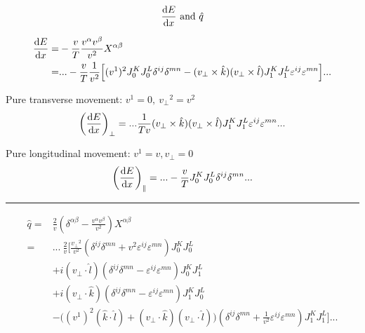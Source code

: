 $$ \frac{\mathop{}\!\mathrm{d} E}{\mathop{}\!\mathrm{d} x} \text{ and } \hat{q} $$

\begin{equation*}
\begin{split}
\frac{\mathop{}\!\mathrm{d} E}{\mathop{}\!\mathrm{d} x} = & -\frac{v}{T} \frac{v^\alpha v^\beta}{v^2} X^{\alpha \beta} \\
 = & ... -\frac{v}{T} \frac{1}{v^2} \Big[ (v^1)^2 J_0^K J_0^L \delta^{ij} \delta^{mn} - (v_\perp \times \hat{k})(v_\perp \times \hat{l}) J_1^K J_1^L  \varepsilon^{ij} \varepsilon^{mn}\Big] ...
\end{split}
\end{equation*}

Pure transverse movement: $v^1 = 0, ~ {v_\perp}^2 = v^2$
\begin{equation*}
\begin{split}
\left( \frac{\mathop{}\!\mathrm{d} E}{\mathop{}\!\mathrm{d} x} \right)_\perp = ... \frac{1}{Tv} (v_\perp \times \hat{k})(v_\perp \times \hat{l}) J_1^K J_1^L  \varepsilon^{ij} \varepsilon^{mn} ...
\end{split}
\end{equation*}

Pure longitudinal movement: $v^1 = v, v_\perp=0$
\begin{equation*}
\left(\frac{\mathop{}\!\mathrm{d} E}{\mathop{}\!\mathrm{d} x} \right)_\parallel = ... -\frac{v}{T} J_0^K J_0^L \delta^{ij} \delta^{mn} ...
\end{equation*}

\hrule

\begin{equation*}
\begin{split}
\hat{q} = & \frac{2}{v} \left( \delta^{\alpha \beta} - \frac{v^\alpha v^\beta}{v^2} \right) X^{\alpha \beta} \\
= & ...~ \frac{2}{v} \Bigg[\frac{{v_\perp}^2}{v^2} \left( \delta^{ij} \delta^{mn} + v^2 \varepsilon^{ij} \varepsilon^{mn} \right) J_0 ^K J_0^L \\
& + i (v_\perp \cdot \hat{l}) (\delta^{ij} \delta^{mn} - \varepsilon^{ij} \varepsilon^{mn}) J_0 ^K J_1^L \\
& + i (v_\perp \cdot \hat{k}) (\delta^{ij} \delta^{mn} - \varepsilon^{ij} \varepsilon^{mn}) J_1 ^K J_0^L \\
& -  \Big( (v^1)^2 (\hat{k} \cdot \hat{l}) +(v_\perp \cdot \hat{k}) (v_\perp \cdot \hat{l}) \Big) \left( \delta^{ij} \delta^{mn} + \frac{1}{v^2} \varepsilon^{ij}\varepsilon^{mn} \right)  J_1 ^K J_1^L \Bigg] ...
\end{split}
\end{equation*}

